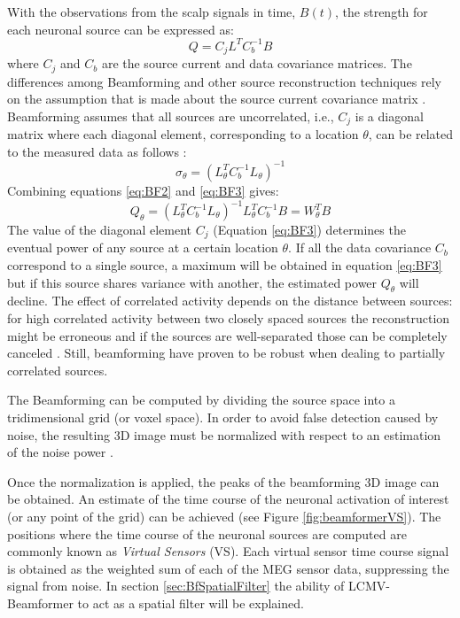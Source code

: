 With the observations from the scalp signals in time, $B(t)$, the strength for each neuronal source can be expressed as:
\begin{equation}
\label{eq:BF2}
	Q =C_{j} L^T C_b^{-1} B
\end{equation}
where $C_j$ and $C_b$ are the source current and data covariance matrices. The differences among Beamforming and other source reconstruction techniques rely on the assumption that is made about the source current covariance matrix \citep{Hillebrand2005}. Beamforming assumes that all sources are uncorrelated, i.e., $C_j$ is a diagonal matrix where each diagonal element, corresponding to a location $\theta$, can be related to the measured data as follows \citep{Mosher2003}:
\begin{equation}
\label{eq:BF3}
	\sigma_{\theta} =(L_{\theta}^T C_b^{-1} L_{\theta})^{-1}
\end{equation}
Combining equations \ref{eq:BF2} and \ref{eq:BF3} gives:
\begin{equation}
\label{eq:BF4}
	Q_{\theta}=(L_{\theta}^T C_b^{-1} L_{\theta})^{-1} L_{\theta}^T C_b^{-1} B = W_{\theta}^T B
\end{equation}
The value of the diagonal element  $C_j$  (Equation \ref{eq:BF3}) determines the eventual power of any source at a certain location $\theta$. If all the data covariance $C_{b}$ correspond to a single source, a maximum will be obtained in equation \ref{eq:BF3} but if this source shares variance with another, the estimated power $Q_{\theta}$ will decline. The effect of correlated activity depends on the distance between sources: for high correlated activity between two closely spaced sources the reconstruction might be erroneous and if the sources are well-separated those can be completely canceled \citep{vanVeen1997}. Still, beamforming have proven to be robust when dealing to partially correlated sources.

The Beamforming can be computed by dividing the source space into a tridimensional grid (or voxel space). In order to avoid false detection caused  by noise, the resulting 3D image must be normalized with respect to an estimation of the noise power \citep{Hillebrand2005,vanVeen1997}.  

Once the normalization is applied, the peaks of the beamforming 3D image can be obtained. An estimate of the time course of the neuronal activation of interest (or any point of the grid) can be achieved (see Figure \ref{fig:beamformerVS}). The positions where the time course of the neuronal sources are computed are commonly known as \emph{Virtual Sensors} (VS). Each virtual sensor time course signal is obtained as the weighted sum of each of the MEG sensor data, suppressing the signal from noise.  In section \ref{sec:BfSpatialFilter} the ability of LCMV-Beamformer to act as a spatial filter will be explained. 

